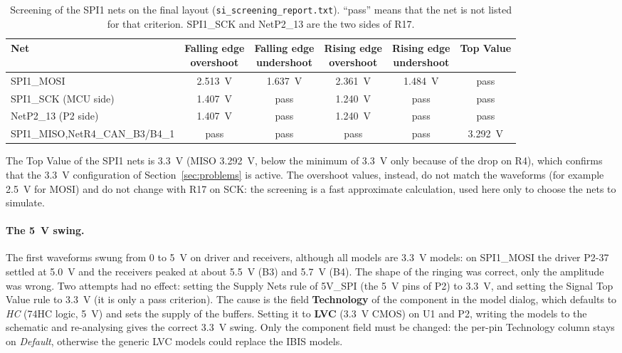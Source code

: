 \documentclass[11pt,a4paper]{article}
\begin{document}
\begin{table}[H]
\centering
\small
\setlength{\tabcolsep}{4pt}
\begin{tabular}{>{\raggedright\arraybackslash}p{}ccccc}
\toprule
Net & \shortstack{Falling edge\\overshoot} & \shortstack{Falling edge\\undershoot} & \shortstack{Rising edge\\overshoot} & \shortstack{Rising edge\\undershoot} & Top Value \\
\midrule
SPI1\_MOSI & \qty{2.513}{V} & \qty{1.637}{V} & \qty{2.361}{V} & \qty{1.484}{V} & pass \\
SPI1\_SCK (MCU side) & \qty{1.407}{V} & pass & \qty{1.240}{V} & pass & pass \\
NetP2\_13 (P2 side) & \qty{1.407}{V} & pass & \qty{1.240}{V} & pass & pass \\
SPI1\_MISO,\newline NetR4\_CAN\_B3/B4\_1 & pass & pass & pass & pass & \qty{3.292}{V} \\
\bottomrule
\end{tabular}
\caption{Screening of the SPI1 nets on the final layout (\texttt{si\_screening\_report.txt}). ``pass''
means that the net is not listed for that criterion. SPI1\_SCK and NetP2\_13 are the two sides
of R17.}
\label{tab:screening}
\end{table}

The Top Value of the SPI1 nets is \qty{3.3}{V} (MISO \qty{3.292}{V}, below the minimum of \qty{3.3}{V} only
because of the drop on R4), which confirms that the \qty{3.3}{V} configuration of Section~\ref{sec:problems} is active.
The overshoot values, instead, do not match the waveforms (for example \qty{2.5}{V} for MOSI) and
do not change with R17 on SCK: the screening is a fast approximate calculation, used here only
to choose the nets to simulate.

\paragraph{The \qty{5}{V} swing.} The first waveforms swung from 0 to \qty{5}{V} on driver and receivers, although
all models are \qty{3.3}{V} models: on SPI1\_MOSI the driver P2-37 settled at \qty{5.0}{V} and the receivers
peaked at about \qty{5.5}{V} (B3) and \qty{5.7}{V} (B4). The shape of the ringing was correct, only the
amplitude was wrong. Two attempts had no effect: setting the Supply Nets rule of 5V\_SPI
(the \qty{5}{V} pins of P2) to \qty{3.3}{V}, and setting the Signal Top Value rule to \qty{3.3}{V} (it is only a pass
criterion). The cause is the field \textbf{Technology} of the component in the model dialog, which
defaults to \textit{HC} (74HC logic, \qty{5}{V}) and sets the supply of the buffers. Setting it to \textbf{LVC} (\qty{3.3}{V}
CMOS) on U1 and P2, writing the models to the schematic and re-analysing gives the correct
\qty{3.3}{V} swing. Only the component field must be changed: the per-pin Technology column stays
on \textit{Default}, otherwise the generic LVC models could replace the IBIS models.
\end{document}
